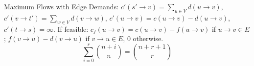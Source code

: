 \begin{minipage}[t]{.47\textwidth}
Maximum Flows with Edge Demands: $\displaystyle c'(s'\rightarrow v)=\sum_{u\in V}d(u\rightarrow v)$, $\displaystyle c'(v\rightarrow t')=\sum_{w\in V}d(v\rightarrow w)$, $\displaystyle c'(u\rightarrow v)=c(u\rightarrow v)-d(u\rightarrow v)$, $\displaystyle c'(t\rightarrow s)=\infty$.
If feasible: $c_f(u\rightarrow v)=c(u\rightarrow v)-f(u\rightarrow v)$ if $u\rightarrow v\in E$; $f(v\rightarrow u)-d(v\rightarrow u)$ if $v\rightarrow u\in E$, $0$ otherwise.
$$\sum_{i=0}^{r} {n + i \choose n} = {n + r + 1 \choose r}$$
\end{minipage}